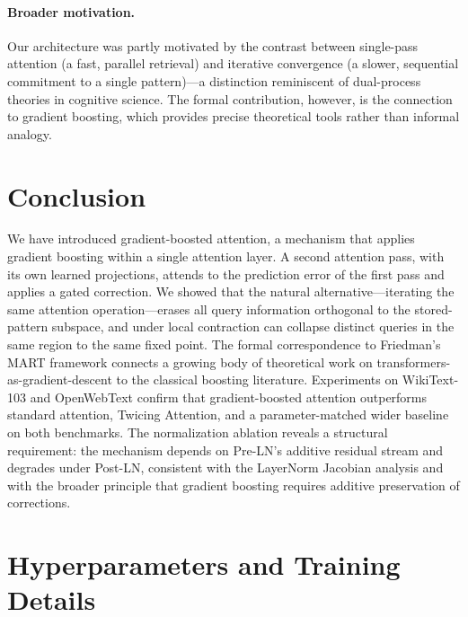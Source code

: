 \documentclass{article}
\theoremstyle{definition}
\begin{document}
\paragraph{Broader motivation.}
Our architecture was partly motivated by the contrast between single-pass attention (a fast, parallel retrieval) and iterative convergence (a slower, sequential commitment to a single pattern)---a distinction reminiscent of dual-process theories in cognitive science.
The formal contribution, however, is the connection to gradient boosting, which provides precise theoretical tools rather than informal analogy.


\section{Conclusion}
\label{sec:conclusion}

We have introduced gradient-boosted attention, a mechanism that applies gradient boosting within a single attention layer.
A second attention pass, with its own learned projections, attends to the prediction error of the first pass and applies a gated correction.
We showed that the natural alternative---iterating the same attention operation---erases all query information orthogonal to the stored-pattern subspace, and under local contraction can collapse distinct queries in the same region to the same fixed point.
The formal correspondence to Friedman's MART framework connects a growing body of theoretical work on transformers-as-gradient-descent to the classical boosting literature.
Experiments on WikiText-103 and OpenWebText confirm that gradient-boosted attention outperforms standard attention, Twicing Attention, and a parameter-matched wider baseline on both benchmarks.
The normalization ablation reveals a structural requirement: the mechanism depends on Pre-LN's additive residual stream and degrades under Post-LN, consistent with the LayerNorm Jacobian analysis and with the broader principle that gradient boosting requires additive preservation of corrections.




\newpage
\appendix

\section{Hyperparameters and Training Details}
\label{app:hyperparams}
\end{document}
